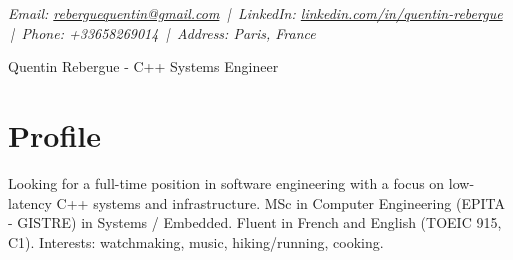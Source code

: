 \documentclass[9pt,a4paper]{article}
\newcommand{\namefont}{\fontsize{18}{22}\selectfont}
\newcommand{\tinyscript}{\fontsize{8}{8}\selectfont}
\begin{document}
\renewcommand\normalsize{\fontsize{10.5}{15}\selectfont}
\normalsize

\begin{center}
  {\tinyscript\itshape
  Email: \href{mailto:reberguequentin@gmail.com}{reberguequentin@gmail.com} \,|\,
  LinkedIn: \href{https://linkedin.com/in/quentin-rebergue}{linkedin.com/in/quentin-rebergue} \,|\,
  Phone: +33658269014 \,|\,
  Address: Paris, France}
\end{center}

\begin{center}
  {\namefont Quentin Rebergue - C++ Systems Engineer}
\end{center}

\section*{Profile}
\begin{tcolorbox}[mybox2]
Looking for a full-time position in software engineering with a focus on low-latency C++ systems and infrastructure. MSc in Computer Engineering (EPITA - GISTRE) in Systems / Embedded. Fluent in French and English (TOEIC 915, C1). Interests: watchmaking, music, hiking/running, cooking.
\end{tcolorbox}
\end{document}
